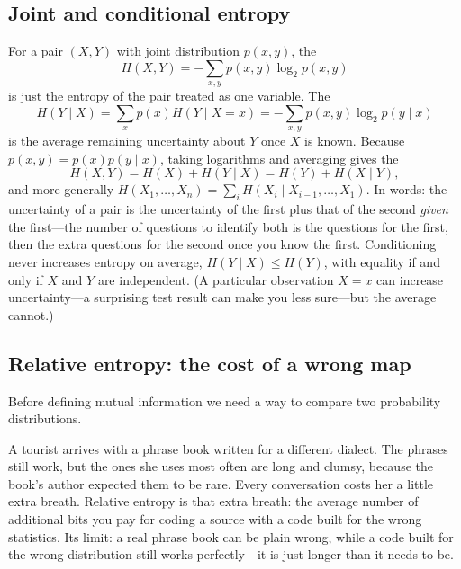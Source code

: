 \subsection{Joint and conditional entropy}

For a pair $(X,Y)$ with joint distribution $p(x,y)$, the 
\[
H(X,Y)=-\sum_{x,y}p(x,y)\log_2p(x,y)
\]
is just the entropy of the pair treated as one variable. The
\begin{equation}
H(Y\mid X)=\sum_xp(x)H(Y\mid X=x)=-\sum_{x,y}p(x,y)\log_2p(y\mid x)
\label{eq:ch13:cond}
\end{equation}
is the average remaining uncertainty about $Y$ once $X$ is known. Because $p(x,y)=p(x)p(y\mid
x)$, taking logarithms and averaging gives the 
\begin{equation}
H(X,Y)=H(X)+H(Y\mid X)=H(Y)+H(X\mid Y),
\label{eq:ch13:chain}
\end{equation}
and more generally $H(X_1,\ldots,X_n)=\sum_iH(X_i\mid X_{i-1},\ldots,X_1)$. In words: the
uncertainty of a pair is the uncertainty of the first plus that of the second \emph{given} the
first---the number of questions to identify both is the questions for the first, then the extra
questions for the second once you know the first. Conditioning never increases entropy on average,
$H(Y\mid X)\le H(Y)$, with equality if and only if $X$ and $Y$ are independent. (A particular
observation $X=x$ can increase uncertainty---a surprising test result can make you less
sure---but the average cannot.)

\subsection{Relative entropy: the cost of a wrong map}

Before defining mutual information we need a way to compare two probability distributions.

\begin{analogy}
A tourist arrives with a phrase book written for a different dialect. The phrases still work,
but the ones she uses most often are long and clumsy, because the book's author expected them to
be rare. Every conversation costs her a little extra breath. Relative entropy is that extra
breath: the average number of additional bits you pay for coding a source with a code built for
the wrong statistics. Its limit: a real phrase book can be plain wrong, while a code built for
the wrong distribution still works perfectly---it is just longer than it needs to be.
\end{analogy}

